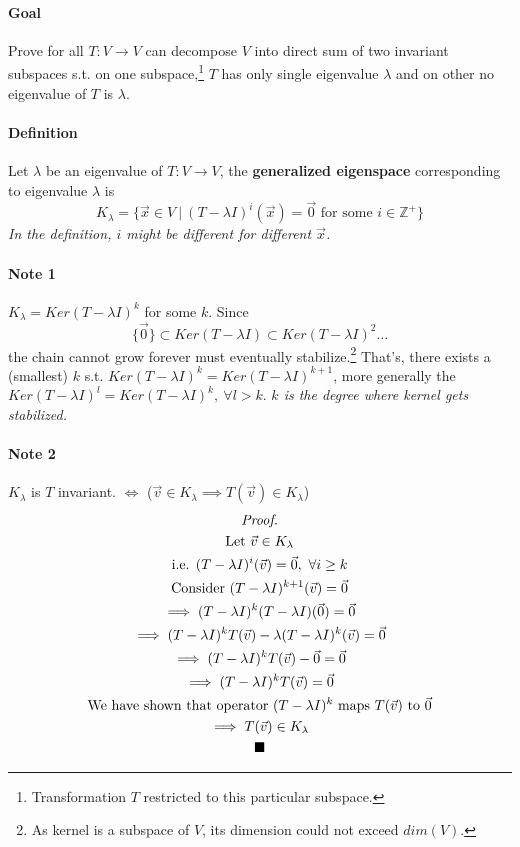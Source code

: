 \documentclass[11pt]{article}
\newcommand{\trans}[3]{{#1}: {#2} \to {#3}}
\newcommand{\definition}[0]{\paragraph{Definition}}
\newcommand{\tx}[1]{\text{{#1}}}
\begin{document}
	\paragraph{Goal} Prove for all $\trans{T}{V}{V}$ can decompose $V$ into direct sum of two invariant subspaces s.t. on one subspace,\footnote{Transformation $T$ restricted to this particular subspace.} $T$ has only single eigenvalue $\lambda$ and on other no eigenvalue of $T$ is $\lambda$.
	\definition Let $\lambda$ be an eigenvalue of $\trans{T}{V}{V}$, the \textbf{generalized eigenspace} corresponding to eigenvalue $\lambda$ is 
	\[
	K_{\lambda} = \{\vec{x} \in V\ \vert\ (T-\lambda I)^i (\vec{x}) = \vec{0}\text{ for some } i \in \mathbb{Z}^+\}
	\]
	\emph{In the definition, $i$ might be different for different $\vec{x}$.}
	
	\paragraph{Note 1} $K_{\lambda} = Ker(T - \lambda I)^k$ for some $k$. Since 
	\[
	\{\vec{0}\} \subset Ker(T - \lambda I) \subset Ker(T - \lambda I)^2 \dots
	\] the chain cannot grow forever must eventually stabilize.\footnote{As kernel is a subspace of $V$, its dimension could not exceed $dim(V)$.} That's, there exists a (smallest) $k$ s.t. $Ker(T - \lambda I)^k = Ker(T - \lambda I)^{k+1}$, more generally the $Ker(T - \lambda I)^{l} = Ker(T - \lambda I)^{k},\ \forall l > k$. \emph{$k$ is the degree where kernel gets stabilized.}
	
	\paragraph{Note 2} $K_{\lambda}$ is $T$ invariant.
	$\iff$ ($ \vec{v} \in K_{\lambda} \implies T(\vec{v}) \in K_{\lambda}$)
	\begin{multline*}
		\emph{Proof.} \\
		\tx{Let } \vec{v} \in K_{\lambda} \\
		\tx{i.e. } (T - \lambda I)^i (\vec{v}) = \vec{0},\ \forall i \geq k \\
		\text{Consider } (T - \lambda I)^{k+1}(\vec{v}) = \vec{0}\\
		\implies (T - \lambda I)^k (T - \lambda I)(\vec{0}) = \vec{0}\\
		\implies (T - \lambda I)^k T(\vec{v}) - \lambda (T - \lambda I)^k (\vec{v}) = \vec{0} \\
		\implies (T - \lambda I)^k T(\vec{v}) - \vec{0} = \vec{0}\\
		\implies (T - \lambda I)^k T(\vec{v}) = \vec{0}\\
		\tx{We have shown that operator $(T - \lambda I)^k$ maps $T(\vec{v})$ to }\vec{0} \\
		\implies T(\vec{v}) \in K_{\lambda} \\
		\blacksquare
	\end{multline*}
	
\end{document}
